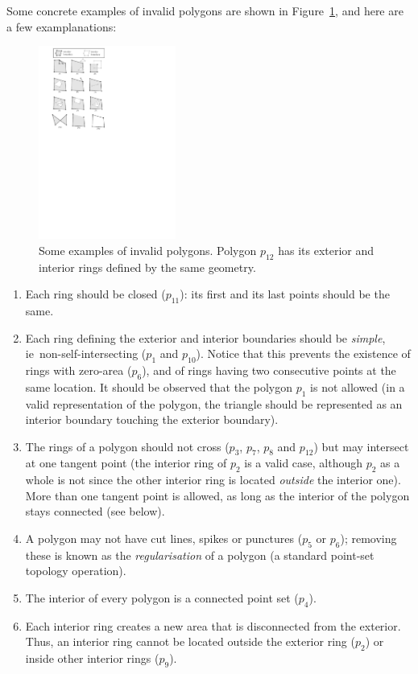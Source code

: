 \documentclass[a4paper,parskip=half,11pt]{scrartcl}
\newcommand{\ie}{ie}
\begin{document}
Some concrete examples of invalid polygons are shown in Figure~\ref{fig:p}, and here are a few examplanations:
\begin{figure}
  \centering
  \includegraphics[width=0.4\textwidth]{figs/unitpolygons.pdf}
  \caption{Some examples of invalid polygons. Polygon $p_{12}$ has its exterior and interior rings defined by the same geometry.}\label{fig:p}
\end{figure}
\begin{enumerate}
  \item Each ring should be closed ($p_{11}$): its first and its last points should be the same.
  \item Each ring defining the exterior and interior boundaries should be \emph{simple}, \ie\ non-self-intersecting ($p_{1}$ and $p_{10}$).  
  Notice that this prevents the existence of rings with zero-area ($p_{6}$), and of rings having two consecutive points at the same location. 
  It should be observed that the polygon $p_{1}$ is not allowed (in a valid representation of the polygon, the triangle should be represented as an interior boundary touching the exterior boundary).
  \item The rings of a polygon should not cross ($p_{3}$, $p_{7}$, $p_{8}$ and $p_{12}$) but may intersect at one tangent point (the interior ring of $p_{2}$ is a valid case, although $p_2$ as a whole is not since the other interior ring is located \emph{outside} the interior one). More than one tangent point is allowed, as long as the interior of the polygon stays connected (see below).
  \item A polygon may not have cut lines, spikes or punctures ($p_{5}$ or $p_{6}$); removing these is known as the \emph{regularisation} of a polygon (a standard point-set topology operation).
  \item The interior of every polygon is a connected point set ($p_{4}$).
  \item Each interior ring creates a new area that is disconnected from the exterior. 
  Thus, an interior ring cannot be located outside the exterior ring ($p_{2}$) or inside other interior rings ($p_{9}$).
\end{enumerate}
\end{document}
